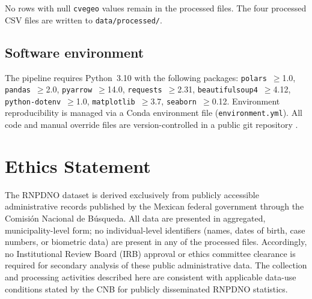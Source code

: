 \documentclass[3p]{elsarticle}
\begin{document}
  No rows with null \texttt{cvegeo} values remain in the                                                                                                                                      
  processed files.                                          
  The four processed CSV files are written to
  \texttt{data/processed/}.                                                                                                                                                                   
   
  \subsection*{Software environment}                                                                                                                                                          
                                                            
  The pipeline requires Python~3.10 with the following
  packages: \texttt{polars}~$\geq$1.0, \texttt{pandas}~$\geq$2.0,
  \texttt{pyarrow}~$\geq$14.0,                                                                                                                                                                
  \texttt{requests}~$\geq$2.31, \texttt{beautifulsoup4}~$\geq$4.12,
  \texttt{python-dotenv}~$\geq$1.0, \texttt{matplotlib}~$\geq$3.7,                                                                                                                            
  \texttt{seaborn}~$\geq$0.12.                              
  Environment reproducibility is managed via a Conda environment                                                                                                                              
  file (\texttt{environment.yml}).                          
  All code and manual override files are version-controlled in a                                                                                                                              
  public git repository \cite{code_repo}.                   

\section*{Ethics Statement}

The RNPDNO dataset is derived exclusively from publicly accessible
administrative records published by the Mexican federal government
through the Comisión Nacional de Búsqueda.
All data are presented in aggregated, municipality-level form;
no individual-level identifiers (names, dates of birth, case
numbers, or biometric data) are present in any of the processed
files.
Accordingly, no Institutional Review Board (IRB) approval or
ethics committee clearance is required for secondary analysis
of these public administrative data.
The collection and processing activities described here are
consistent with applicable data-use conditions stated by the CNB
for publicly disseminated RNPDNO statistics.
\end{document}

